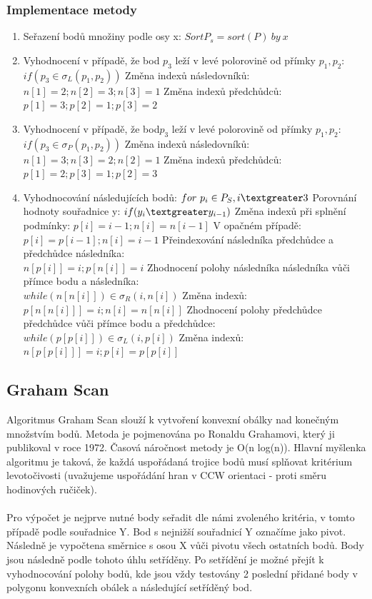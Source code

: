 \documentclass[a4paper, 12pt]{article}
\begin{document}
\subsubsection{Implementace metody}
\begin{enumerate}
\item Seřazení bodů množiny podle osy x: $ Sort P_s = sort(P) ~by~ x $ 
\item Vyhodnocení v případě, že bod $p_3$ leží v levé polorovině od přímky $ p_1, p_2$:  \\
$ if (p_3 \in \sigma_L (p_1, p_2)) $ 
\subitem Změna indexů následovníků: $ n[1] = 2; n[2] = 3; n[3] = 1  $
\subitem Změna indexů předchůdců: $ p[1] = 3; p[2] = 1; p[3] = 2  $
\item Vyhodnocení v případě, že bod$ p_3$ leží v levé polorovině od přímky $ p_1, p_2$:  \\
$ if (p_3 \in \sigma_P (p_1, p_2)) $ 
\subitem Změna indexů následovníků: $ n[1] = 3; n[3] = 2; n[2] = 1  $
\subitem Změna indexů předchůdců: $ p[1] = 2; p[3] = 1; p[2] = 3  $
\item Vyhodnocování následujících bodů: $ for~ p_i \in P_S, i \textgreater 3$
\subitem Porovnání hodnoty souřadnice y: $ if (y_i \textgreater y_{i-1})  $
\subsubitem Změna indexů při splnění podmínky: $ p[i] = i-1; n[i] = n[i-1]$
\subsubitem V opačném případě: $ p[i] = p[i-1]; n[i] = i-1$
\subitem Přeindexování následníka předchůdce a předchůdce následníka: \\
$ n[p[i]] = i; p[n[i]] = i  $
\subitem Zhodnocení polohy následníka následníka vůči přímce bodu a následníka: \\
$ while (n[n[i]]) \in \sigma_R (i, n[i])  $
\subsubitem Změna indexů: $ p[n[n[i]]] = i; n[i] = n[n[i]]$
\subitem Zhodnocení polohy předchůdce předchůdce vůči přímce bodu a předchůdce: \\
$ while (p[p[i]]) \in \sigma_L (i, p[i])  $
\subsubitem Změna indexů: $ n[p[p[i]]] = i; p[i] = p[p[i]]$
\end{enumerate}


\subsection{Graham Scan}
Algoritmus Graham Scan slouží k vytvoření konvexní obálky nad konečným množstvím bodů. Metoda je pojmenována po Ronaldu Grahamovi, který ji publikoval v roce 1972. Časová náročnost metody je O(n log(n)). Hlavní myšlenka algoritmu je taková, že každá uspořádaná trojice bodů musí splňovat kritérium levotočivosti (uvažujeme uspořádání hran v CCW orientaci - proti směru hodinových ručiček).\\
\\
Pro výpočet je nejprve nutné body seřadit dle námi zvoleného kritéria, v tomto případě podle souřadnice Y. Bod s nejnižší souřadnicí Y označíme jako pivot. Následně je vypočtena směrnice s osou X vůči pivotu všech ostatních bodů. Body jsou následně podle tohoto úhlu setříděny. Po setřídění je možné přejít k vyhodnocování polohy bodů, kde jsou vždy testovány 2 poslední přidané body v polygonu konvexních obálek a následující setříděný bod.
\end{document}
